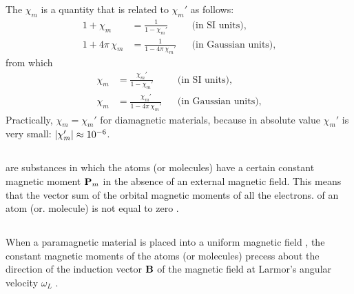 \subsection{}\label{26.3.4} The  $\chi_{m}$ is a quantity that is re­lated to $\chi_{m}'$ as follows:
\begin{align*}%
1 + \chi_{m} & =  \frac{1}{1 - \chi_{m}'} && \text{(in SI units),} \\
1 + 4\pi \, \chi_{m} & =  \frac{1}{1 - 4 \pi \,\chi_{m}'}  && \text{(in Gaussian units)},
\end{align*}
from which
\begin{align*}%
\chi_{m} & =  \frac{\chi_{m}'}{1 - \chi_{m}'} && \text{(in SI units),} \\
\chi_{m} & =  \frac{\chi_{m}'}{1 - 4\pi \, \chi_{m}'} && \text{(in Gaussian units)},
\end{align*}
Practically, $\chi_{m} = \chi_{m}'$ for diamagnetic materials, because in absolute value $\chi_{m}'$ is very small: $\abs{\chi_{m}'} \approx  \num{d-6}$.

\subsection{}\label{26.3.5}  are substances in which the atoms (or molecules) have a certain constant magnetic moment $\vb{P}_{m}$ in the absence of an external magnetic field. This means that the vector sum of the orbital magnetic moments of all the electrons. of an atom (or. molecule) is not equal to zero .

\subsection{}\label{26.3.6} When a paramagnetic material is placed into a uniform magnetic field , the constant magnetic moments of the atoms (or molecules) precess about the direction of the induction vector $\vb{B}$ of the magnetic field at Larmor's angular velocity $\omega_{L}$ .

